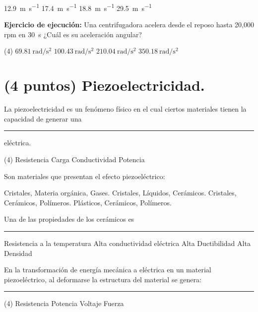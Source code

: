 \documentclass[12pt, letter]{exam}
\begin{document}
\begin{questions}
\begin{tasks}
        \task \SI{12.9}{\meter\per\second}
        \task \SI{17.4}{\meter\per\second}
        \task \SI{18.8}{\meter\per\second}
        \task \SI{29.5}{\meter\per\second}
    \end{tasks}
    \question \label{Ejercicio_03} \textbf{Ejercicio de ejecución: } Una centrifugadora acelera desde el reposo hasta 20,000 rpm en \SI{30}{\second} ¿Cuál es su aceleración angular?
    \begin{tasks}(4)
        \task $\displaystyle \SI[per-mode=fraction]{69.81}{\radian\per\square\second}$
        \task $\displaystyle \SI[per-mode=fraction]{100.43}{\radian\per\square\second}$
        \task $\displaystyle \SI[per-mode=fraction]{210.04}{\radian\per\square\second}$
        \task $\displaystyle \SI[per-mode=fraction]{350.18}{\radian\per\square\second}$
    \end{tasks}

    \section{(4 puntos) Piezoelectricidad.}

    \question La piezoelectricidad es un fenómeno físico en el cual ciertos materiales tienen la capacidad de generar una \rule{2cm}{0.1mm} eléctrica.
    \begin{tasks}(4)
        \task Resistencia
        \task Carga
        \task Conductividad
        \task Potencia
    \end{tasks}
    \question Son materiales que presentan el efecto piezoeléctrico:
    \begin{multicols}{2}
    \begin{tasks}
        \task Cristales, Materia orgánica, Gases.
        \task Cristales, Líquidos, Cerámicos.
        \task Cristales, Cerámicos, Polímeros.
        \task Plásticos, Cerámicos, Polímeros.
    \end{tasks}
    \end{multicols}
    \question Una de las propiedades de los cerámicos es \rule{2cm}{0.1mm}

    \vspace{0.5cm}
    \begin{multicols}{2}
        \begin{tasks}
            \task Resistencia a la temperatura
            \task Alta conductividad eléctrica
            \task Alta Ductibilidad
            \task Alta Densidad
        \end{tasks}
    \end{multicols}
    \question En la transformación de energía mecánica a eléctrica en un material piezoeléctrico, al deformarse la estructura del material se genera: \rule{2cm}{0.1mm}
    \begin{tasks}(4)
        \task Resistencia
        \task Potencia
        \task Voltaje
        \task Fuerza
    \end{tasks}
    

\end{questions}
\end{document}
